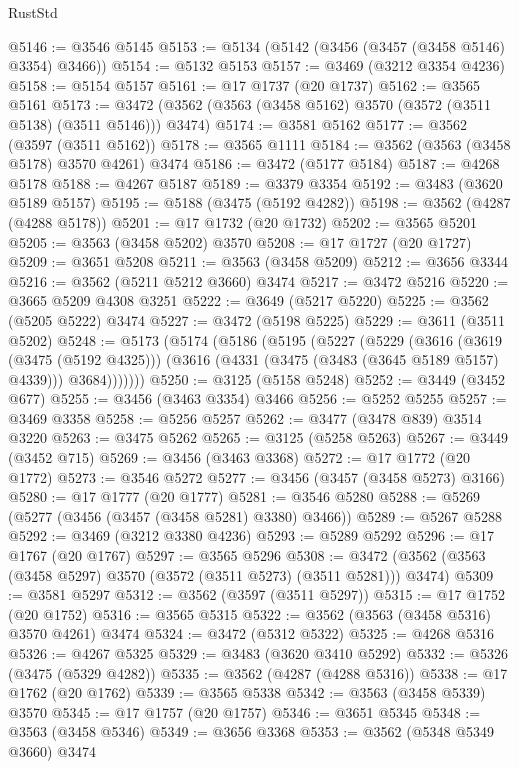 \begin{lexlean}{RustStd}
\begin{coremodule}
{\begin{coremodule}
{{{{{{{{{{{{{{{{{{{{{{{{{{{{{{{{{{{{{{{{{{{{{@5146 := @3546 @5145
@5153 := @5134 (@5142 (@3456 (@3457 (@3458 @5146) @3354) @3466))
@5154 := @5132 @5153
@5157 := @3469 (@3212 @3354 @4236)
@5158 := @5154 @5157
@5161 := @17 @1737 (@20 @1737)
@5162 := @3565 @5161
@5173 := @3472 (@3562 (@3563 (@3458 @5162) @3570 (@3572 (@3511 @5138) (@3511 @5146))) @3474)
@5174 := @3581 @5162
@5177 := @3562 (@3597 (@3511 @5162))
@5178 := @3565 @1111
@5184 := @3562 (@3563 (@3458 @5178) @3570 @4261) @3474
@5186 := @3472 (@5177 @5184)
@5187 := @4268 @5178
@5188 := @4267 @5187
@5189 := @3379 @3354
@5192 := @3483 (@3620 @5189 @5157)
@5195 := @5188 (@3475 (@5192 @4282))
@5198 := @3562 (@4287 (@4288 @5178))
@5201 := @17 @1732 (@20 @1732)
@5202 := @3565 @5201
@5205 := @3563 (@3458 @5202) @3570
@5208 := @17 @1727 (@20 @1727)
@5209 := @3651 @5208
@5211 := @3563 (@3458 @5209)
@5212 := @3656 @3344
@5216 := @3562 (@5211 @5212 @3660) @3474
@5217 := @3472 @5216
@5220 := @3665 @5209 @4308 @3251
@5222 := @3649 (@5217 @5220)
@5225 := @3562 (@5205 @5222) @3474
@5227 := @3472 (@5198 @5225)
@5229 := @3611 (@3511 @5202)
@5248 := @5173
    (@5174
      (@5186
        (@5195
          (@5227
            (@5229
              (@3616
                (@3619 (@3475 (@5192 @4325)))
                (@3616 (@4331 (@3475 (@3483 (@3645 @5189 @5157) @4339))) @3684)))))))
@5250 := @3125 (@5158 @5248)
@5252 := @3449 (@3452 @677)
@5255 := @3456 (@3463 @3354) @3466
@5256 := @5252 @5255
@5257 := @3469 @3358
@5258 := @5256 @5257
@5262 := @3477 (@3478 @839) @3514 @3220
@5263 := @3475 @5262
@5265 := @3125 (@5258 @5263)
@5267 := @3449 (@3452 @715)
@5269 := @3456 (@3463 @3368)
@5272 := @17 @1772 (@20 @1772)
@5273 := @3546 @5272
@5277 := @3456 (@3457 (@3458 @5273) @3166)
@5280 := @17 @1777 (@20 @1777)
@5281 := @3546 @5280
@5288 := @5269 (@5277 (@3456 (@3457 (@3458 @5281) @3380) @3466))
@5289 := @5267 @5288
@5292 := @3469 (@3212 @3380 @4236)
@5293 := @5289 @5292
@5296 := @17 @1767 (@20 @1767)
@5297 := @3565 @5296
@5308 := @3472 (@3562 (@3563 (@3458 @5297) @3570 (@3572 (@3511 @5273) (@3511 @5281))) @3474)
@5309 := @3581 @5297
@5312 := @3562 (@3597 (@3511 @5297))
@5315 := @17 @1752 (@20 @1752)
@5316 := @3565 @5315
@5322 := @3562 (@3563 (@3458 @5316) @3570 @4261) @3474
@5324 := @3472 (@5312 @5322)
@5325 := @4268 @5316
@5326 := @4267 @5325
@5329 := @3483 (@3620 @3410 @5292)
@5332 := @5326 (@3475 (@5329 @4282))
@5335 := @3562 (@4287 (@4288 @5316))
@5338 := @17 @1762 (@20 @1762)
@5339 := @3565 @5338
@5342 := @3563 (@3458 @5339) @3570
@5345 := @17 @1757 (@20 @1757)
@5346 := @3651 @5345
@5348 := @3563 (@3458 @5346)
@5349 := @3656 @3368
@5353 := @3562 (@5348 @5349 @3660) @3474
}}}}}}}}}}}}}}}}}}}}}}}}}}}}}}}}}}}}}}}}}}}}}
\end{coremodule}}
\end{coremodule}
\end{lexlean}
